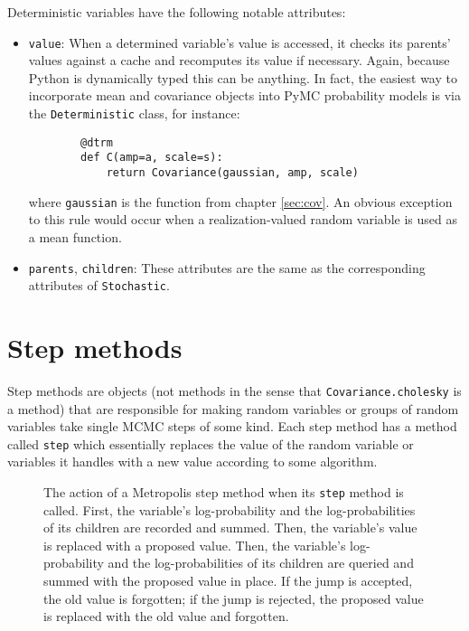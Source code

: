 \documentclass{report}
\begin{document}
Deterministic variables have the following notable attributes:
\begin{itemize}
    \item \texttt{value}: When a determined variable's value is accessed, it checks its parents' values against a cache and recomputes its value if necessary. Again, because Python is dynamically typed this can be anything. In fact, the easiest way to incorporate mean and covariance objects into PyMC probability models is via the \texttt{Deterministic} class, for instance:
    \begin{verbatim}
        @dtrm
        def C(amp=a, scale=s):
            return Covariance(gaussian, amp, scale)
    \end{verbatim}
    where \texttt{gaussian} is the function from chapter \ref{sec:cov}. An obvious exception to this rule would occur when a realization-valued random variable is used as a mean function.

    \item \texttt{parents}, \texttt{children}: These attributes are the same as the corresponding attributes of \texttt{Stochastic}.
\end{itemize}

\section{Step methods}
Step methods are objects (not methods in the sense that \texttt{Covariance.cholesky} is a method) that are responsible for making random variables or groups of random variables take single MCMC steps of some kind. Each step method has a method called \texttt{step} which essentially replaces the value of the random variable or variables it handles with a new value according to some algorithm.

\begin{figure}
    \centering
    \caption{The action of a Metropolis step method when its \texttt{step} method is called. First, the variable's log-probability and the log-probabilities of its children are recorded and summed. Then, the variable's value is replaced with a proposed value. Then, the variable's log-probability and the log-probabilities of its children are queried and summed with the proposed value in place. If the jump is accepted, the old value is forgotten; if the jump is rejected, the proposed value is replaced with the old value and forgotten.}
    \label{metropoliscartoon}
\end{figure}
\end{document}
